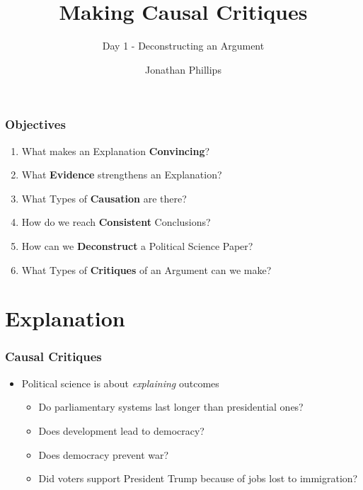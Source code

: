 \documentclass[xcolor=x11names,compress]{beamer}\usepackage[]{graphicx}\usepackage[]{color}
\title{Making Causal Critiques}
\subtitle{Day 1 - Deconstructing an Argument}
\author{Jonathan Phillips}
\renewcommand{\(}{\begin{columns}}
\renewcommand{\)}{\end{columns}}
\newcommand{\<}[1]{\begin{column}{#1}}
\renewcommand{\>}{\end{column}}
\begin{document}
\frame{\titlepage}

\begin{frame}
\frametitle{Objectives}
\begin{enumerate}
\item What makes an Explanation \textbf{Convincing}?
\pause
\item What \textbf{Evidence} strengthens an Explanation?
\pause
\item What Types of \textbf{Causation} are there?
\pause
\item How do we reach \textbf{Consistent} Conclusions?
\pause
\item How can we \textbf{Deconstruct} a Political Science Paper?
\pause
\item What Types of \textbf{Critiques} of an Argument can we make?
\end{enumerate}
\end{frame}

\section{Explanation}

\begin{frame}
\frametitle{Causal Critiques}
\begin{itemize}
\item Political science is about \textit{explaining} outcomes
\pause
\begin{itemize}
\item Do parliamentary systems last longer than presidential ones?
\pause
\item Does development lead to democracy?
\pause
\item Does democracy prevent war?
\pause
\item Did voters support President Trump because of jobs lost to immigration?
\end{itemize}
\end{itemize}

\end{frame}
\end{document}
